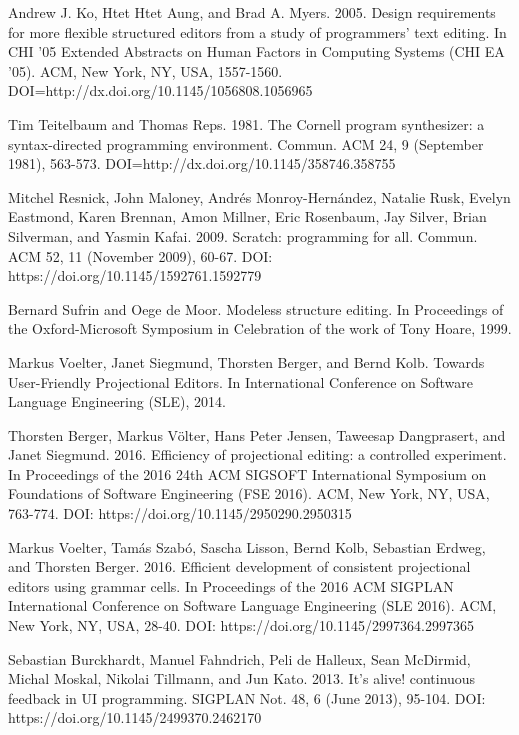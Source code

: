 \documentclass[runningheads]{llncs}
\begin{document}
\begin{thebibliography}{88}
Andrew J. Ko, Htet Htet Aung, and Brad A. Myers. 2005. Design requirements for more flexible structured editors from a study of programmers' text editing. In CHI '05 Extended Abstracts on Human Factors in Computing Systems (CHI EA '05). ACM, New York, NY, USA, 1557-1560. DOI=http://dx.doi.org/10.1145/1056808.1056965


Tim Teitelbaum and Thomas Reps. 1981. The Cornell program synthesizer: a syntax-directed programming environment. Commun. ACM 24, 9 (September 1981), 563-573. DOI=http://dx.doi.org/10.1145/358746.358755

Mitchel Resnick, John Maloney, Andrés Monroy-Hernández, Natalie Rusk, Evelyn Eastmond, Karen Brennan, Amon Millner, Eric Rosenbaum, Jay Silver, Brian Silverman, and Yasmin Kafai. 2009. Scratch: programming for all. Commun. ACM 52, 11 (November 2009), 60-67. DOI: https://doi.org/10.1145/1592761.1592779

Bernard Sufrin and Oege de Moor. Modeless structure editing. In Proceedings of the Oxford-Microsoft Symposium in Celebration of the work of Tony Hoare, 1999.

Markus Voelter, Janet Siegmund, Thorsten Berger, and Bernd Kolb. Towards User-Friendly Projectional Editors. In International Conference on Software Language Engineering (SLE), 2014.

Thorsten Berger, Markus Völter, Hans Peter Jensen, Taweesap Dangprasert, and Janet Siegmund. 2016. Efficiency of projectional editing: a controlled experiment. In Proceedings of the 2016 24th ACM SIGSOFT International Symposium on Foundations of Software Engineering (FSE 2016). ACM, New York, NY, USA, 763-774. DOI: https://doi.org/10.1145/2950290.2950315

Markus Voelter, Tamás Szabó, Sascha Lisson, Bernd Kolb, Sebastian Erdweg, and Thorsten Berger. 2016. Efficient development of consistent projectional editors using grammar cells. In Proceedings of the 2016 ACM SIGPLAN International Conference on Software Language Engineering (SLE 2016). ACM, New York, NY, USA, 28-40. DOI: https://doi.org/10.1145/2997364.2997365

Sebastian Burckhardt, Manuel Fahndrich, Peli de Halleux, Sean McDirmid, Michal Moskal, Nikolai Tillmann, and Jun Kato. 2013. It's alive! continuous feedback in UI programming. SIGPLAN Not. 48, 6 (June 2013), 95-104. DOI: https://doi.org/10.1145/2499370.2462170


\end{thebibliography}
\end{document}
